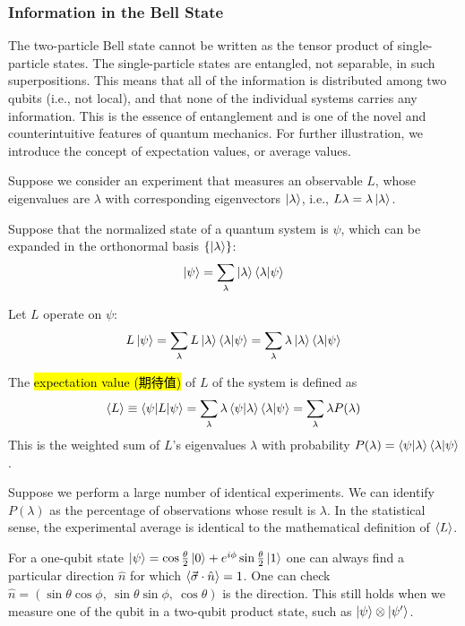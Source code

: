 \subsubsection{Information in the Bell State}
The two-particle Bell state cannot be written as the tensor product of single-particle states. The single-particle states are entangled, not separable, in such superpositions. This means that all of the information is distributed among two qubits (i.e., not local), and that none of the individual systems carries any information. This is the essence of entanglement and is one of the novel and counterintuitive features of quantum mechanics. For further illustration, we introduce the concept of expectation values, or average values.

Suppose we consider an experiment that measures an observable $L$, whose eigenvalues are $\lambda$ with corresponding eigenvectors $\ket{\lambda}$, i.e., $L\lambda=\lambda\ket{\lambda}$. 

Suppose that the normalized state of a quantum system is $\psi$, which can be expanded in the orthonormal basis $\left\{ \ket{\lambda} \right\}$: 
\begin{align*}
    \ket{\psi}=\sum_{\lambda}\ket{\lambda}\braket{\lambda|\psi}
\end{align*}

Let $L$ operate on $\psi$: 
\begin{align*}
    L\ket{\psi}=\sum_{\lambda}L\ket{\lambda}\braket{\lambda|\psi}=\sum_{\lambda}\lambda\ket{\lambda}\braket{\lambda|\psi}
\end{align*}

The \hl{expectation value (期待值)} of $L$ of the system is defined as
\begin{align*}
    \braket{L}\equiv \braket{\psi|L|\psi}=\sum_{\lambda}\lambda\braket{\psi|\lambda}\braket{\lambda|\psi}=\sum_{\lambda}\lambda P(\lambda)
\end{align*}
This is the weighted sum of $L$'s eigenvalues $\lambda$ with probability $P(\lambda)=\braket{\psi|\lambda}\braket{\lambda|\psi}$. 

Suppose we perform a large number of identical experiments. We can identify $P(\lambda)$ as the percentage of observations whose result is $\lambda$. In the statistical sense, the experimental average is identical to the mathematical definition of $\braket{L}$.

For a one-qubit state $\ket{\psi}=\cos\frac{\theta}{2}\ket{0}+e^{i\phi}\sin\frac{\theta}{2}\ket{1}$ one can always find a particular direction $\hat{n}$ for which $\braket{\vec{\sigma}\cdot\hat{n}}=1$. One can check $\hat{n}=(\sin\theta\cos\phi,\ \sin\theta\sin\phi,\ \cos\theta) $ is the direction. This still holds when we measure one of the qubit in a two-qubit product state, such as $\ket{\psi}\otimes\ket{\psi'}$.

